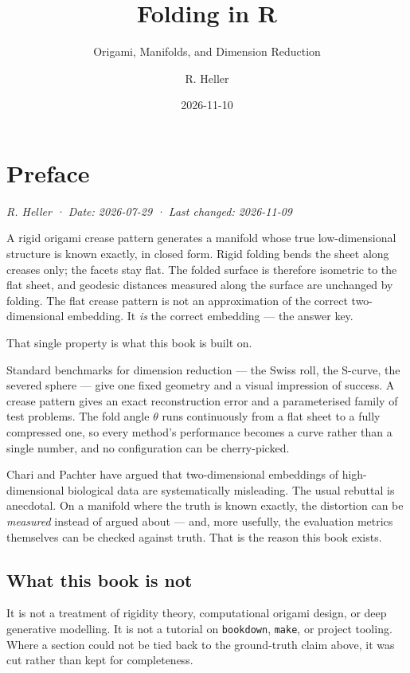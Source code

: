 \documentclass[
  british,
  a4paper,
]{book}
\title{Folding in R}
\subtitle{Origami, Manifolds, and Dimension Reduction}
\author{R. Heller}
\date{2026-11-10}
\begin{document}
\maketitle

{
\setcounter{tocdepth}{2}
\tableofcontents
}
\listoffigures
\chapter*{Preface}\label{preface}

\emph{R. Heller · Date: 2026-07-29 · Last changed: 2026-11-09}

A rigid origami crease pattern generates a manifold whose true low-dimensional
structure is known exactly, in closed form. Rigid folding bends the sheet along
creases only; the facets stay flat. The folded surface is therefore isometric to
the flat sheet, and geodesic distances measured along the surface are unchanged
by folding. The flat crease pattern is not an approximation of the correct
two-dimensional embedding. It \emph{is} the correct embedding --- the answer key.

That single property is what this book is built on.

Standard benchmarks for dimension reduction --- the Swiss roll, the S-curve, the
severed sphere --- give one fixed geometry and a visual impression of success.
A crease pattern gives an exact reconstruction error and a parameterised family
of test problems. The fold angle \(\theta\) runs continuously from a flat sheet to
a fully compressed one, so every method's performance becomes a curve rather
than a single number, and no configuration can be cherry-picked.

Chari and Pachter have argued that two-dimensional embeddings of
high-dimensional biological data are systematically misleading. The usual
rebuttal is anecdotal. On a manifold where the truth is known exactly, the
distortion can be \emph{measured} instead of argued about --- and, more usefully, the
evaluation metrics themselves can be checked against truth. That is the reason
this book exists.

\section*{What this book is not}\label{what-this-book-is-not}

It is not a treatment of rigidity theory, computational origami design, or deep
generative modelling. It is not a tutorial on \texttt{bookdown}, \texttt{make}, or project
tooling. Where a section could not be tied back to the ground-truth claim above,
it was cut rather than kept for completeness.
\end{document}
